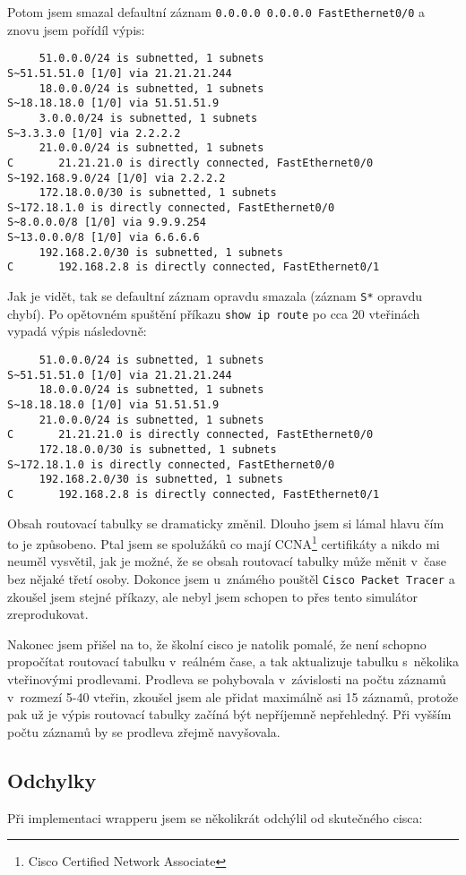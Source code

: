 Potom jsem smazal defaultní záznam \verb|0.0.0.0 0.0.0.0 FastEthernet0/0| a znovu jsem pořídíl výpis:
\begin{verbatim}
     51.0.0.0/24 is subnetted, 1 subnets
S~51.51.51.0 [1/0] via 21.21.21.244
     18.0.0.0/24 is subnetted, 1 subnets
S~18.18.18.0 [1/0] via 51.51.51.9
     3.0.0.0/24 is subnetted, 1 subnets
S~3.3.3.0 [1/0] via 2.2.2.2
     21.0.0.0/24 is subnetted, 1 subnets
C       21.21.21.0 is directly connected, FastEthernet0/0
S~192.168.9.0/24 [1/0] via 2.2.2.2
     172.18.0.0/30 is subnetted, 1 subnets
S~172.18.1.0 is directly connected, FastEthernet0/0
S~8.0.0.0/8 [1/0] via 9.9.9.254
S~13.0.0.0/8 [1/0] via 6.6.6.6
     192.168.2.0/30 is subnetted, 1 subnets
C       192.168.2.8 is directly connected, FastEthernet0/1
\end{verbatim} 
Jak je vidět, tak se defaultní záznam opravdu smazala (záznam \verb|S*| opravdu chybí). Po opětovném spuštění příkazu \verb|show ip route| po cca 20 vteřinách vypadá výpis následovně:
\begin{verbatim}
     51.0.0.0/24 is subnetted, 1 subnets
S~51.51.51.0 [1/0] via 21.21.21.244
     18.0.0.0/24 is subnetted, 1 subnets
S~18.18.18.0 [1/0] via 51.51.51.9
     21.0.0.0/24 is subnetted, 1 subnets
C       21.21.21.0 is directly connected, FastEthernet0/0
     172.18.0.0/30 is subnetted, 1 subnets
S~172.18.1.0 is directly connected, FastEthernet0/0
     192.168.2.0/30 is subnetted, 1 subnets
C       192.168.2.8 is directly connected, FastEthernet0/1
\end{verbatim} 

Obsah routovací tabulky se dramaticky změnil. Dlouho jsem si lámal hlavu čím to je způsobeno. Ptal jsem se spolužáků co mají CCNA\footnote{Cisco Certified Network Associate} certifikáty a nikdo mi neuměl vysvětil, jak je možné, že se obsah routovací tabulky může měnit v~čase bez nějaké třetí osoby. Dokonce jsem u~známého pouštěl \verb|Cisco Packet Tracer| a zkoušel jsem stejné příkazy, ale nebyl jsem schopen to přes tento simulátor zreprodukovat.

Nakonec jsem přišel na to, že školní cisco je natolik pomalé, že není schopno propočítat routovací tabulku v~reálném čase, a tak aktualizuje tabulku s~několika vteřinovými prodlevami. Prodleva se pohybovala v~závislosti na počtu záznamů v~rozmezí 5-40 vteřin, zkoušel jsem ale přidat maximálně asi 15 záznamů, protože pak už je výpis routovací tabulky začíná být nepříjemně nepřehledný. Při vyšším počtu záznamů by se prodleva zřejmě navyšovala. 

\subsection{Odchylky}
Při implementaci wrapperu jsem se několikrát odchýlil od skutečného cisca:

